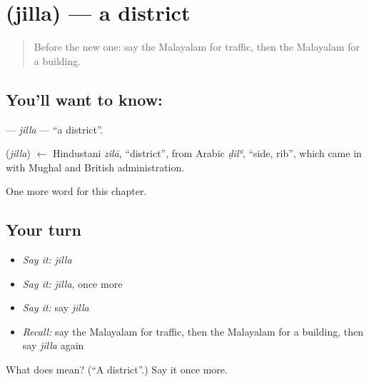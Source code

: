 \section[\texorpdfstring{\ml{ജില്ല} (jilla)}{ജില്ല (jilla)}]{ (jilla) — a district}

\label{lesson:ML-C278-jilla}



\begin{quote}
Before the new one: say the Malayalam for traffic, then the Malayalam for a building.
\end{quote}

\subsection*{You'll want to know: }
\textbf{} — \emph{jilla} — \textquotedblleft{}a district\textquotedblright{}.

\begin{cousinweb}
\textbf{} (\emph{jilla}) $\leftarrow$ Hindustani \emph{zilā}, \textquotedblleft{}district\textquotedblright{}, from Arabic \emph{ḍilʿ}, \textquotedblleft{}side, rib\textquotedblright{}, which came in with Mughal and British administration.
\end{cousinweb}

\begin{grammarlens}[title={What you've built}]
One more word for this chapter.
\end{grammarlens}

\subsection*{Your turn}
\begin{itemize}
\raggedright
  \item \emph{Say it:} \emph{jilla}
  \item \emph{Say it:} \emph{jilla}, once more
  \item \emph{Say it:} say \emph{jilla}
  \item \emph{Recall:} say the Malayalam for traffic, then the Malayalam for a building, then say \emph{jilla} again
\end{itemize}

\begin{tcolorbox}[breakable,colback=teal!4,colframe=teal!35!black,title={Before you move on}]
What does  mean? (\textquotedblleft{}A district\textquotedblright{}.) Say it once more.
\end{tcolorbox}
